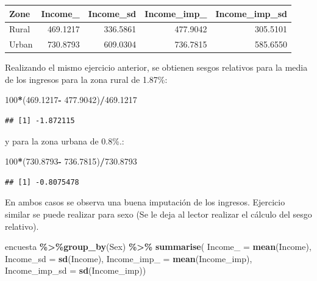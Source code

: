 \documentclass[
  12pt,
]{book}
\newenvironment{Shaded}{\begin{snugshade}}{\end{snugshade}}
\newcommand{\AttributeTok}[1]{\textcolor[rgb]{0.13,0.29,0.53}{#1}}
\newcommand{\DecValTok}[1]{\textcolor[rgb]{0.00,0.00,0.81}{#1}}
\newcommand{\FloatTok}[1]{\textcolor[rgb]{0.00,0.00,0.81}{#1}}
\newcommand{\FunctionTok}[1]{\textcolor[rgb]{0.13,0.29,0.53}{\textbf{#1}}}
\newcommand{\NormalTok}[1]{#1}
\newcommand{\SpecialCharTok}[1]{\textcolor[rgb]{0.81,0.36,0.00}{\textbf{#1}}}
\begin{document}
\begin{tabular}{l|r|r|r|r}
\hline
Zone & Income\_ & Income\_sd & Income\_imp\_ & Income\_imp\_sd\\
\hline
Rural & 469.1217 & 336.5861 & 477.9042 & 305.5101\\
\hline
Urban & 730.8793 & 609.0304 & 736.7815 & 585.6550\\
\hline
\end{tabular}

Realizando el mismo ejercicio anterior, se obtienen sesgos relativos para la media de los ingresos para la zona rural de 1.87\%:

\begin{Shaded}
\begin{Highlighting}[]
\DecValTok{100}\SpecialCharTok{*}\NormalTok{(}\FloatTok{469.1217}\SpecialCharTok{{-}} \FloatTok{477.9042}\NormalTok{)}\SpecialCharTok{/}\FloatTok{469.1217}
\end{Highlighting}
\end{Shaded}

\begin{verbatim}
## [1] -1.872115
\end{verbatim}

y para la zona urbana de 0.8\%.:

\begin{Shaded}
\begin{Highlighting}[]
\DecValTok{100}\SpecialCharTok{*}\NormalTok{(}\FloatTok{730.8793}\SpecialCharTok{{-}} \FloatTok{736.7815}\NormalTok{)}\SpecialCharTok{/}\FloatTok{730.8793}
\end{Highlighting}
\end{Shaded}

\begin{verbatim}
## [1] -0.8075478
\end{verbatim}

En ambos casos se observa una buena imputación de los ingresos. Ejercicio similar se puede realizar para sexo (Se le deja al lector realizar el cálculo del sesgo relativo).

\begin{Shaded}
\begin{Highlighting}[]
\NormalTok{encuesta }\SpecialCharTok{\%\textgreater{}\%}\FunctionTok{group\_by}\NormalTok{(Sex) }\SpecialCharTok{\%\textgreater{}\%}  \FunctionTok{summarise}\NormalTok{(}
  \AttributeTok{Income\_ =} \FunctionTok{mean}\NormalTok{(Income),}
  \AttributeTok{Income\_sd =} \FunctionTok{sd}\NormalTok{(Income),}
  \AttributeTok{Income\_imp\_ =} \FunctionTok{mean}\NormalTok{(Income\_imp),}
  \AttributeTok{Income\_imp\_sd =} \FunctionTok{sd}\NormalTok{(Income\_imp))}
\end{Highlighting}
\end{Shaded}
\end{document}
